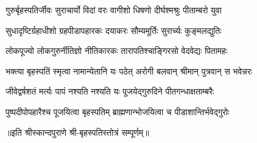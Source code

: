 

\twolineshloka
{गुरुर्बृहस्पतिर्जीवः सुराचार्यो विदां वरः}
{वागीशो धिषणो दीर्घश्मश्रुः पीताम्बरो युवा}

\twolineshloka
{सुधादृष्टिर्ग्रहाधीशो ग्रहपीडापहारकः}
{दयाकरः सौम्यमूर्तिः सुरार्च्यः कुङ्मलद्युतिः}

\twolineshloka
{लोकपूज्यो लोकगुरुर्नीतिज्ञो नीतिकारकः}
{तारापतिश्चाङ्गिरसो वेदवेद्यः पितामहः}

\twolineshloka
{भक्त्या बृहस्पतिं स्मृत्वा नामान्येतानि यः पठेत्}
{अरोगी बलवान् श्रीमान् पुत्रवान् स भवेन्नरः}

\twolineshloka
{जीवेद्वर्षशतं मर्त्यः पापं नश्यति नश्यति}
{यः पूजयेद्गुरुदिने पीतगन्धाक्षताम्बरैः}

\twolineshloka
{पुष्पदीपोपहारैश्च पूजयित्वा बृहस्पतिम्}
{ब्राह्मणान्भोजयित्वा च पीडाशान्तिर्भवेद्गुरोः}

॥इति श्रीस्कान्दपुराणे श्री-बृहस्पतिस्तोत्रं सम्पूर्णम्॥

